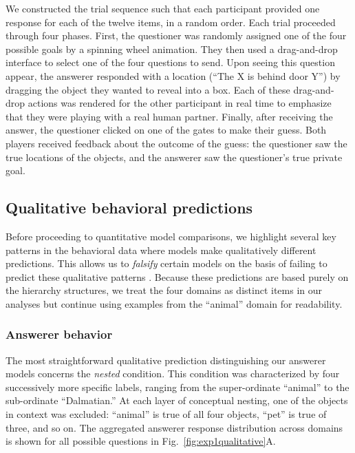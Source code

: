 \documentclass[11pt, floatsintext]{apa6}
\begin{document}
We constructed the trial sequence such that each participant provided one response for each of the twelve items, in a random order.
Each trial proceeded through four phases. 
First, the questioner was randomly assigned one of the four possible goals by a spinning wheel animation.
They then used a drag-and-drop interface to select one of the four questions to send.
Upon seeing this question appear, the answerer responded with a location (``The X is behind door Y'') by dragging the object they wanted to reveal into a box. 
Each of these drag-and-drop actions was rendered for the other participant in real time to emphasize that they were playing with a real human partner.
Finally, after receiving the answer, the questioner clicked on one of the gates to make their guess. 
Both players received feedback about the outcome of the guess: the questioner saw the true locations of the objects, and the answerer saw the questioner's true private goal. 

\subsection{Qualitative behavioral predictions}

Before proceeding to quantitative model comparisons, we highlight several key patterns in the behavioral data where models make qualitatively different predictions. 
This allows us to \emph{falsify} certain models on the basis of failing to predict these qualitative patterns \cite{palminteri2017importance}.
Because these predictions are based purely on the hierarchy structures, we treat the four domains as distinct items in our analyses but continue using examples from the ``animal'' domain for readability.

\subsubsection{Answerer behavior}
The most straightforward qualitative prediction distinguishing our answerer models concerns the \emph{nested} condition. 
This condition was characterized by four successively more specific labels, ranging from the super-ordinate ``animal'' to the sub-ordinate ``Dalmatian.'' 
At each layer of conceptual nesting, one of the objects in context was excluded: ``animal'' is true of all four objects, ``pet'' is true of three, and so on.
The aggregated answerer response distribution across domains is shown for all possible questions in Fig.~\ref{fig:exp1qualitative}A.
\end{document}

